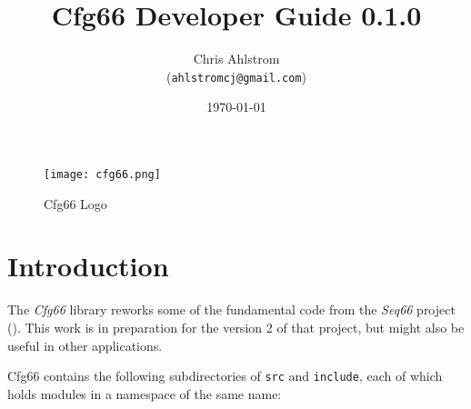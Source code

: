 \documentclass[
 11pt,
 twoside,
 a4paper,
 final                                 %
]{article}
\begin{document}
\title{Cfg66 Developer Guide 0.1.0}
\author{Chris Ahlstrom \\
   (\texttt{ahlstromcj@gmail.com})}
\date{\today}
\maketitle

\begin{figure}[H]
   \centering 
   \texttt{[image: cfg66.png]}
   \caption*{Cfg66 Logo}
\end{figure}

\clearpage                             %

\tableofcontents
\listoffigures                         %
\listoftables                          %


\setlength{\parindent}{2em}
\setlength{\parskip}{1ex plus 0.5ex minus 0.2ex}

\rhead{\rightmark}         %

\section{Introduction}
\label{sec:introduction}

   The \textsl{Cfg66} library reworks some of the fundamental code
   from the \textsl{Seq66} project (\cite{seq66}).
   This work is in preparation for the version 2 of that project, but
   might also be useful in other applications.

   Cfg66 contains the following subdirectories of \texttt{src} and
   \texttt{include}, each of which holds modules in a
   namespace of the same name:
\end{document}
